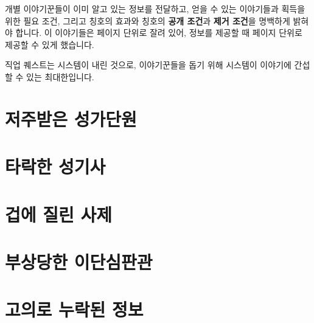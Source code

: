 \documentclass{report}
\begin{document}
	개별 이야기꾼들이 이미 알고 있는 정보를 전달하고, 얻을 수 있는 이야기들과 획득을 위한 필요 조건, 그리고 칭호의 효과와 칭호의 \textbf{공개 조건}과 \textbf{제거 조건}을 명백하게 밝혀야 합니다. 이 이야기들은 페이지 단위로 잘려 있어, 정보를 제공할 때 페이지 단위로 제공할 수 있게 했습니다.
	
	직업 퀘스트는 시스템이 내린 것으로, 이야기꾼들을 돕기 위해 시스템이 이야기에 간섭할 수 있는 최대한입니다.
	
	\pagebreak \hypertarget{cursed-bard}{}
	\section{저주받은 성가단원}
	
	\pagebreak \hypertarget{corrupt-paladin}{}
	\section{타락한 성기사}
	
	\pagebreak \hypertarget{cowardly-priest}{}
	\section{겁에 질린 사제}
	
	\pagebreak \hypertarget{hurt-rogue}{}
	\section{부상당한 이단심판관}
		
	\pagebreak
	\section{고의로 누락된 정보}
		
	
\end{document}
